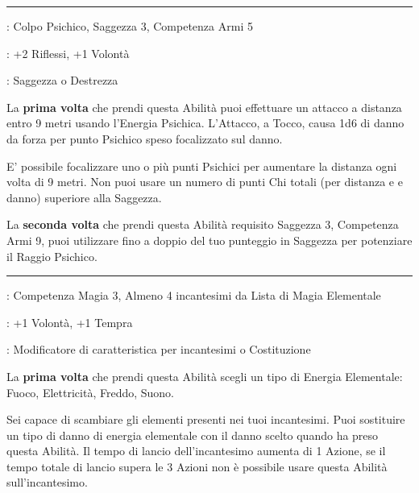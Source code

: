 \begin{multicols}{2}
\smallskip\noindent\rule{\linewidth}{2pt} \hypertarget{Raggio Psichico}{}\medskip{}
\noindent
\begin{description}[noitemsep, topsep=0pt, parsep=0pt, partopsep=0pt, leftmargin=0cm, labelwidth=2.5cm]
    \item[\textbf{Requisito}]: Colpo Psichico, Saggezza 3, Competenza Armi 5
    \item[\textbf{Tiri Salvezza}]: +2 Riflessi, +1 Volontà
    \item[\textbf{Caratteristica}]: Saggezza o Destrezza
\end{description}

La \textbf{prima volta} che prendi questa Abilità puoi effettuare un attacco a distanza entro 9 metri usando l'Energia Psichica. L'Attacco, a Tocco, causa 1d6 di danno da forza per punto Psichico speso focalizzato sul danno.

E' possibile focalizzare uno o più punti Psichici per aumentare la distanza ogni volta di 9 metri. Non puoi usare un numero di punti Chi totali (per distanza e e danno) superiore alla Saggezza.

La \textbf{seconda volta} che prendi questa Abilità requisito Saggezza 3, Competenza Armi 9, puoi utilizzare fino a doppio del tuo punteggio in Saggezza per potenziare il Raggio Psichico.

\smallskip\noindent\rule{\linewidth}{2pt} \hypertarget{Elementalista}{}\medskip{}
\noindent
\begin{description}[noitemsep, topsep=0pt, parsep=0pt, partopsep=0pt, leftmargin=0cm, labelwidth=2.5cm]
    \item[\textbf{Requisito}]: Competenza Magia 3, Almeno 4 incantesimi da Lista di Magia Elementale
    \item[\textbf{Tiri Salvezza}]: +1 Volontà, +1 Tempra
    \item[\textbf{Caratteristica}]: Modificatore di caratteristica per incantesimi o Costituzione
\end{description}

La \textbf{prima volta} che prendi questa Abilità scegli un tipo di Energia Elementale: Fuoco, Elettricità, Freddo, Suono.

Sei capace di scambiare gli elementi presenti nei tuoi incantesimi. Puoi sostituire un tipo di danno di energia elementale con il danno scelto quando ha preso questa Abilità.
Il tempo di lancio dell'incantesimo aumenta di 1 Azione, se il tempo totale di lancio supera le 3 Azioni non è possibile usare questa Abilità sull'incantesimo.


\end{multicols}
